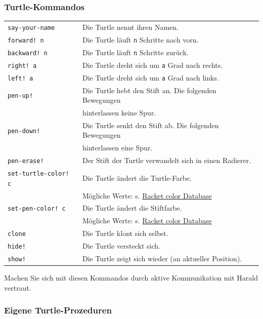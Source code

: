 \documentclass[12pt,a4paper]{scrartcl}
\begin{document}
\subsubsection*{Turtle-Kommandos}
\begin{tabular}{ll}
\texttt{say-your-name}  & Die Turtle nennt ihren Namen.\\
\texttt{forward! n} 	& Die Turtle läuft \texttt{n} Schritte nach vorn. \\
\texttt{backward! n} 	& Die Turtle läuft \texttt{n} Schritte zur\"{u}ck. \\
\texttt{right! a} 		& Die Turtle dreht sich um \texttt{a} Grad nach rechts. \\
	\texttt{left! a} 	& Die Turtle dreht sich um \texttt{a} Grad nach links. \\
\texttt{pen-up!} 		& Die Turtle hebt den Stift an. Die folgenden Bewegungen\\ & hinterlassen keine Spur. \\
\texttt{pen-down!} 		& Die Turtle senkt den Stift ab. Die folgenden Bewegungen\\ & hinterlassen eine Spur. \\
\texttt{pen-erase!}	    & Der Stift der Turtle verwandelt sich in einen Radierer. \\
\texttt{set-turtle-color! c}& Die Turtle \"{a}ndert die Turtle-Farbe. \\
						& M\"{o}gliche Werte: s. \href{http://docs.racket-lang.org/draw/color-database___.html?q=the-color-database}{Racket color Database} \\
\texttt{set-pen-color! c}   & Die Turtle \"{a}ndert die Stiftfarbe. \\
						& M\"{o}gliche Werte: s. \href{http://docs.racket-lang.org/draw/color-database___.html?q=the-color-database}{Racket color Database} \\
\texttt{clone} 			& Die Turtle klont sich selbst. \\
\texttt{hide!} 			& Die Turtle versteckt sich. \\
\texttt{show!} 			& Die Turtle zeigt sich wieder (an aktueller Position).
\end{tabular}

Machen Sie sich mit diesen Kommandos durch aktive Kommunikation mit Harald vertraut.

\subsubsection*{Eigene Turtle-Prozeduren}
\end{document}
